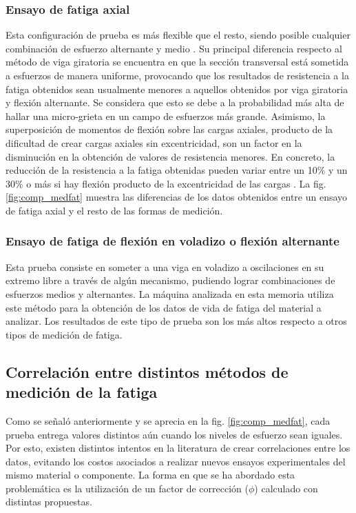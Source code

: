 \subsubsection{Ensayo de fatiga axial}
Esta configuración de prueba es más flexible que el resto, siendo posible cualquier combinación de esfuerzo alternante y medio 	\cite{norton2011machine}. Su principal diferencia respecto al método de viga giratoria se encuentra en que la sección transversal está sometida a esfuerzos de manera uniforme, provocando que los resultados de resistencia a la fatiga obtenidos sean usualmente menores a aquellos obtenidos por viga giratoria y flexión alternante. Se considera que esto se debe a la  probabilidad más alta de hallar una micro-grieta en un campo de esfuerzos más grande. Asimismo, la superposición de momentos de flexión sobre las cargas axiales, producto de la dificultad de crear cargas axiales sin excentricidad, son un factor en la disminución en la obtención de valores de resistencia menores. En concreto, la reducción de la resistencia a la fatiga obtenidas pueden variar entre un 10$\%$ y un 30$\%$ o más si hay flexión producto de la excentricidad de las cargas \cite{bannantine1990fundamentals}. La fig. \ref{fig:comp_medfat} muestra las diferencias de los datos obtenidos entre un ensayo de fatiga axial y el resto de las formas de medición.

\subsubsection{Ensayo de fatiga de flexión en voladizo o flexión alternante}
Esta prueba consiste en someter a una viga en voladizo a oscilaciones en su extremo libre a través de algún mecanismo, pudiendo lograr combinaciones de esfuerzos medios y alternantes. La máquina analizada en esta memoria utiliza este método para la obtención de los datos de vida de fatiga del material a analizar. Los resultados de este tipo de prueba son los más altos respecto a otros tipos de medición de fatiga.

\subsection{Correlación entre distintos métodos de medición de la fatiga}
Como se señaló anteriormente y se aprecia en la fig. \ref{fig:comp_medfat}, cada prueba entrega valores distintos aún cuando los niveles de esfuerzo sean iguales. Por esto, existen distintos intentos en la literatura de crear correlaciones entre los datos, evitando los costos asociados a realizar nuevos ensayos experimentales del mismo material o componente. La forma en que se ha abordado esta problemática es la utilización de un factor de corrección ($\phi$) calculado con distintas propuestas.

